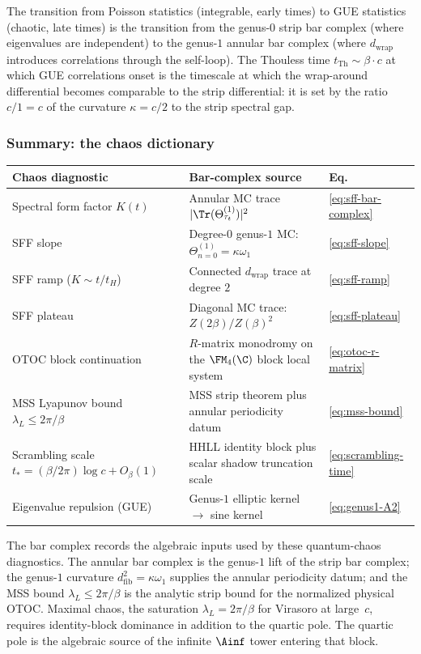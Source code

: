 \begin{remark}
The transition from Poisson statistics (integrable, early times)
to GUE statistics (chaotic, late times) is the transition from
the genus-$0$ strip bar complex (where eigenvalues are
independent) to the genus-$1$ annular bar complex (where
$d_{\mathrm{wrap}}$ introduces correlations through the
self-loop). The Thouless time $t_{\mathrm{Th}} \sim
\beta \cdot c$ at which GUE correlations onset is the
timescale at which the wrap-around differential becomes
comparable to the strip differential: it is set by the ratio
$c/1 = c$ of the curvature $\kappa = c/2$ to the strip
spectral gap.
\end{remark}

\subsubsection*{Summary: the chaos dictionary}

\begin{center}
\small
\renewcommand{\arraystretch}{1.25}
\begin{tabular}{lll}
\textbf{Chaos diagnostic}
 & \textbf{Bar-complex source}
 & \textbf{Eq.} \\
\hline
Spectral form factor $K(t)$
 & Annular MC trace $|\Tr(\Theta^{(1)}_{\tau_t})|^2$
 & \eqref{eq:sff-bar-complex} \\
SFF slope
 & Degree-$0$ genus-$1$ MC: $\Theta^{(1)}_{n=0} = \kappa\omega_1$
 & \eqref{eq:sff-slope} \\
SFF ramp ($K \sim t/t_H$)
 & Connected $d_{\mathrm{wrap}}$ trace at degree $2$
 & \eqref{eq:sff-ramp} \\
SFF plateau
 & Diagonal MC trace: $Z(2\beta)/Z(\beta)^2$
 & \eqref{eq:sff-plateau} \\
OTOC block continuation
 & \(R\)-matrix monodromy on the \(\FM_4(\C)\) block local system
 & \eqref{eq:otoc-r-matrix} \\
MSS Lyapunov bound \(\lambda_L\le2\pi/\beta\)
 & MSS strip theorem plus annular periodicity datum
 & \eqref{eq:mss-bound} \\
Scrambling scale \(t_*=(\beta/2\pi)\log c+O_\beta(1)\)
 & HHLL identity block plus scalar shadow truncation scale
 & \eqref{eq:scrambling-time} \\
Eigenvalue repulsion (GUE)
 & Genus-$1$ elliptic kernel $\to$ sine kernel
 & \eqref{eq:genus1-A2} \\
\end{tabular}
\end{center}
The bar complex records the algebraic inputs used by these
quantum-chaos diagnostics.  The annular bar complex is the genus-$1$
lift of the strip bar complex; the genus-$1$ curvature
\(d_{\mathrm{fib}}^2=\kappa\omega_1\) supplies the annular periodicity
datum; and the MSS bound \(\lambda_L\le2\pi/\beta\) is the analytic
strip bound for the normalized physical OTOC.  Maximal chaos, the
saturation \(\lambda_L=2\pi/\beta\) for Virasoro at large~\(c\),
requires identity-block dominance in addition to the quartic pole.  The
quartic pole is the algebraic source of the infinite \(\Ainf\) tower
entering that block.

